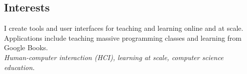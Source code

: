 \documentclass[margin]{res}
\begin{document}
 

 
\address{1618 Milvia St. \#5\\Berkeley, CA 94709}
\address{glassman@alum.mit.edu\\
(215) 694-9631} 

 
\begin{resume} 
 
\section{Interests} 
I create tools and user interfaces for teaching and learning online and at scale. Applications include teaching massive programming classes and learning from Google Books.\\
{\it Human-computer interaction (HCI), learning at scale, computer science education.}






\end{resume}
\end{document}
